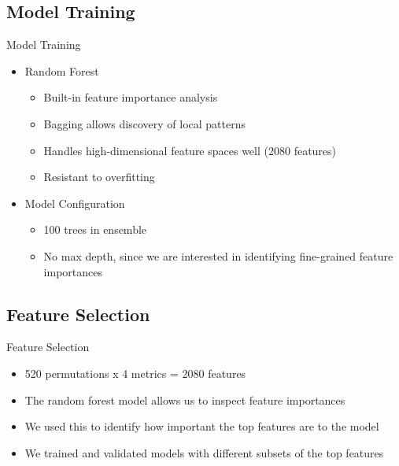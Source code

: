 \documentclass{beamer}
\begin{document}
\subsection{Model Training}
\begin{frame}{Model Training}
    \begin{itemize}
        \item Random Forest
        \begin{itemize}
            \item Built-in feature importance analysis
            \item Bagging allows discovery of local patterns
            \item Handles high-dimensional feature spaces well (2080 features)
            \item Resistant to overfitting
        \end{itemize}
        \item Model Configuration
        \begin{itemize}
            \item 100 trees in ensemble
            \item No max depth, since we are interested in identifying fine-grained feature importances
        \end{itemize}
    \end{itemize}
\end{frame}

\subsection{Feature Selection}
\begin{frame}{Feature Selection}
    \begin{itemize}
        \item 520 permutations x 4 metrics = 2080 features
        \item The random forest model allows us to inspect feature importances
        \item We used this to identify how important the top features are to the model
        \item We trained and validated models with different subsets of the top features
    \end{itemize}
\end{frame}
\end{document}
